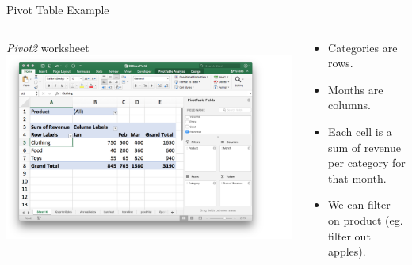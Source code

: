 \documentclass[xcolor=svgnames]{beamer}
\begin{document}
\begin{frame}{Pivot Table Example}
\begin{columns}[T] %
\begin{column}{.48\textwidth}
\textit{Pivot2} worksheet
{\includegraphics[width=1.2\textwidth]{pivotExample}}
\end{column}%
\hfill%
\begin{column}{.48\textwidth}
\vspace{1em}
\begin{itemize}
\item Categories are rows.
\item Months are columns.
\item Each cell is a sum of revenue per category for that month.
\item We can filter on product (eg. filter out apples).
\end{itemize}
\end{column}%
\end{columns}
\end{frame}
\end{document}
